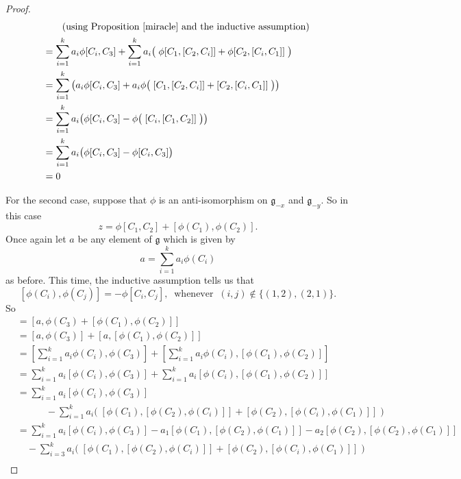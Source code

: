 \documentclass[honours]{UNSWthesis}
\newcommand{\g}{\mathfrak{g}}
\newcommand{\1}{\mathbf{e}_{1}}
\newcommand{\2}{\mathbf{e}_{3}}
\newcommand{\3}{\mathbf{e}_{3}}
\begin{document}
\begin{proof}
\begin{align*}
& \quad \quad \text{(using Proposition \ref{miracle} and the inductive assumption) } \\
&=\sum\limits_{i=1}^{k} a_{i}\phi[C_{i},C_{3}]+ \sum\limits_{i=1}^{k} a_{i}\big(\; \phi[C_{1},[C_{2},C_{i}]]+\phi[C_{2},[C_{i},C_{1}]] \;\big) \\
&=\sum\limits_{i=1}^{k} \big( a_{i}\phi[C_{i},C_{3}]+ a_{i}\phi\big(\; [C_{1},[C_{2},C_{i}]]+[C_{2},[C_{i},C_{1}]] \;\big)\big) \\
&=\sum\limits_{i=1}^{k} a_{i}\big(\phi[C_{i},C_{3}]- \phi\big(\; [C_{i},[C_{1},C_{2}]] \;\big)\big) \\
&=\sum\limits_{i=1}^{k} a_{i}\big(\phi[C_{i},C_{3}]- \phi[C_{i},C_{3}] \big) \\
&=0
\end{align*}

For the second case, suppose that $\phi$ is an anti-isomorphism on $\g_{-x}$ and $\g_{-y}$. So in this case
\[
z=\phi[C_{1},C_{2}]+[\phi(C_{1}),\phi(C_{2})].
\]
\newline
Once again let $a$ be any element of $\g$ which is given by 
\[
a=\sum\limits_{i=1}^{k} a_{i}\phi(C_{i})
\] as before.
This time, the inductive assumption tells us that 
\[
[\phi(C_{i}),\phi(C_{j})]=-\phi[C_{i},C_{j}],\;\;\text{whenever}\;\; (i,j) \notin \{(1,2),(2,1)\}.
\]
\newline
So
\begin{align*}
[a,z] &= [a,\phi(C_{3})+[\phi(C_{1}),\phi(C_{2})]] \\
&=[a,\phi(C_{3})]+[a,[\phi(C_{1}),\phi(C_{2})]] \\
&=\left[\sum\limits_{i=1}^{k} a_{i}\phi(C_{i}),\phi(C_{3}) \right]+\left[ \sum\limits_{i=1}^{k} a_{i}\phi(C_{i}),[\phi(C_{1}),\phi(C_{2})]\right] \\
&=\sum\limits_{i=1}^{k} a_{i}[\phi(C_{i}),\phi(C_{3})]+\sum\limits_{i=1}^{k} a_{i}[\phi(C_{i}),[\phi(C_{1}),\phi(C_{2})]] \\
&=\sum\limits_{i=1}^{k} a_{i}[\phi(C_{i}),\phi(C_{3})]\\
&\quad \quad \quad- \sum\limits_{i=1}^{k} a_{i}\big(\; [\phi(C_{1}),[\phi(C_{2}),\phi(C_{i})]]+[\phi(C_{2}),[\phi(C_{i}),\phi(C_{1})]]\;\big) \\
&=\sum\limits_{i=1}^{k} a_{i}[\phi(C_{i}),\phi(C_{3})]-a_{1}[\phi(C_{1}),[\phi(C_{2}),\phi(C_{1})]]-a_{2}[\phi(C_{2}),[\phi(C_{2}),\phi(C_{1})]] \\
&\quad- \sum\limits_{i=3}^{k} a_{i}\big(\; [\phi(C_{1}),[\phi(C_{2}),\phi(C_{i})]]+[\phi(C_{2}),[\phi(C_{i}),\phi(C_{1})]] \;\big) \\

\end{align*}
\end{proof}
\end{document}
